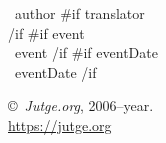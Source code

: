 \documentclass[11pt]{article}
\begin{document}
\providecommand{\SampleOneCol}{{curly samples1c}} 
\providecommand{\SampleTwoCol}{{curly samples2c}} 



\ProblemInformation

\Author\ {{author}}
{{#if translator}}
    \\ 
{{/if}}
{{#if event}}
    \\
    \Event\ {{event}}
{{/if}}
{{#if eventDate}}
    \\
    \EventDate\ {{eventDate}}
{{/if}}

\bigskip


\bigskip

\copyright\ \emph{Jutge.org}, 2006--{{year}}.
\\
\href{https://jutge.org}{https://jutge.org}
\end{document}
